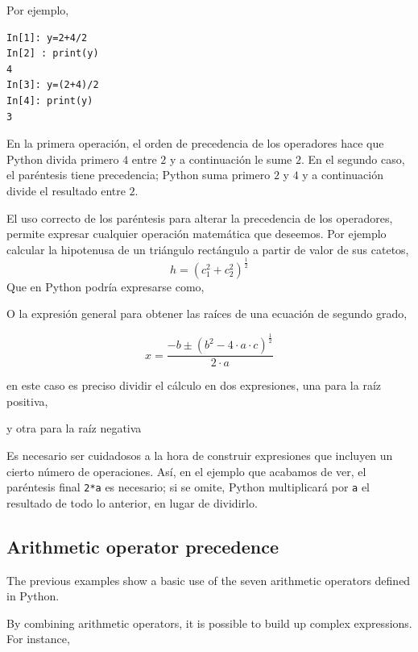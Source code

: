 \begin{paracol}{2}
Por ejemplo,
\begin{verbatim}
In[1]: y=2+4/2
In[2] : print(y) 
4
In[3]: y=(2+4)/2
In[4]: print(y)
3
\end{verbatim}

En la primera operación, el orden de precedencia de los operadores hace que Python divida primero $4$ entre $2$ y a continuación le sume $2$. En el segundo caso, el paréntesis tiene precedencia; Python suma primero $2$ y $4$ y a continuación divide el resultado entre $2$.

El uso correcto de los paréntesis para alterar la precedencia de los operadores, permite expresar cualquier operación matemática que deseemos. Por ejemplo calcular la hipotenusa de un triángulo rectángulo a partir de valor de sus catetos,
\begin{equation*}
h=(c_1^2+c_2^2)^{\frac{1}{2}}
\end{equation*}
Que en Python podría expresarse como,

O la expresión general para obtener las raíces de una ecuación de segundo grado,

\begin{equation*}
x= \frac{-b\pm(b^2-4\cdot a \cdot c)^{\frac{1}{2}}}{2\cdot a}
\end{equation*}

en este caso es preciso dividir el cálculo en dos expresiones, una para la raíz positiva,

y otra para la raíz negativa


Es necesario ser cuidadosos a la hora de construir expresiones que incluyen un cierto número de operaciones. Así, en el ejemplo que acabamos de ver, el paréntesis final \texttt{2*a} es necesario; si se omite, Python multiplicará por \texttt{a} el resultado de todo lo anterior, en lugar de dividirlo.
\switchcolumn
\subsection{Arithmetic operator precedence}
The previous examples show a basic use of the seven arithmetic operators defined in Python.  
 
By combining arithmetic operators, it is possible to build up complex expressions. For instance,


\end{paracol}
